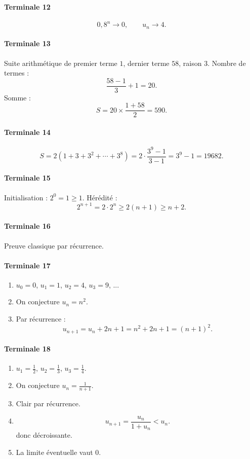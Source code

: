 \documentclass[11pt,a4paper]{article}
\theoremstyle{definition}
\begin{document}
\paragraph{Terminale 12}
\[
0{,}8^n\to0,\qquad u_n\to4.
\]

\paragraph{Terminale 13}
Suite arithmétique de premier terme $1$, dernier terme $58$, raison $3$.  
Nombre de termes :
\[
\frac{58-1}{3}+1=20.
\]
Somme :
\[
S=20\times \frac{1+58}{2}=590.
\]

\paragraph{Terminale 14}
\[
S=2(1+3+3^2+\cdots+3^8)=2\cdot \frac{3^9-1}{3-1}=3^9-1=19682.
\]

\paragraph{Terminale 15}
Initialisation : $2^0=1\ge1$.  
Hérédité :
\[
2^{n+1}=2\cdot 2^n\ge 2(n+1)\ge n+2.
\]

\paragraph{Terminale 16}
Preuve classique par récurrence.

\paragraph{Terminale 17}
\begin{enumerate}[label=\arabic*.]
    \item $u_0=0$, $u_1=1$, $u_2=4$, $u_3=9$, ...
    \item On conjecture $u_n=n^2$.
    \item Par récurrence :
    \[
    u_{n+1}=u_n+2n+1=n^2+2n+1=(n+1)^2.
    \]
\end{enumerate}

\paragraph{Terminale 18}
\begin{enumerate}[label=\arabic*.]
    \item $u_1=\frac12$, $u_2=\frac13$, $u_3=\frac14$.
    \item On conjecture $u_n=\frac1{n+1}$.
    \item Clair par récurrence.
    \item
    \[
    u_{n+1}=\frac{u_n}{1+u_n}<u_n.
    \]
    donc décroissante.
    \item La limite éventuelle vaut $0$.
\end{enumerate}
\end{document}
